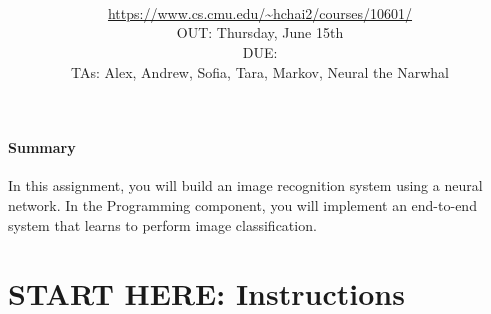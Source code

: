 \documentclass[11pt,addpoints,answers]{exam}
\title{\textsc{\hwName}
} %
\author{\courseName\\
\url{https://www.cs.cmu.edu/~hchai2/courses/10601/} \\
OUT: Thursday, June 15th \\
DUE: \dueDate{} \\ 
TAs: Alex, Andrew, Sofia, Tara, Markov, Neural the Narwhal
}
\date{}
\date{}
\begin{document}
\maketitle

\begin{notebox}
\paragraph{Summary} In this assignment, you will build an image recognition system using a neural network. In the Programming component, you will implement an end-to-end system that learns to perform image classification.
\end{notebox}
\section*{START HERE: Instructions}
\end{document}

